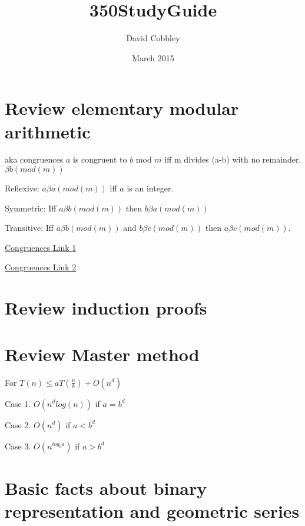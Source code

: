 \documentclass[10 pt]{article}
\title{350StudyGuide}
\author{David Cobbley }
\date{March 2015}
\begin{document}
\maketitle

\tableofcontents
\pagebreak
\section{Review elementary modular arithmetic}
aka congruences
$a$ is congruent to $b$ mod $m$ iff m divides (a-b) with no remainder. $\beta b(mod (m))$

Reflexive: $a \beta a(mod(m))$ iff $a$ is an integer.

Symmetric: Iff $a \beta b(mod(m))$ then $b \beta a(mod(m))$

Transitive: Iff $a \beta b(mod (m))$ and $ b \beta c(mod(m))$ then $a \beta c(mod(m))$.





\href{http://www.articlesforeducators.com/article.asp?aid=161#.VQTEfY7F_iU}{Congruences Link 1}

\href{http://mathworld.wolfram.com/Congruence.html}{Congruences Link 2}

\section{Review induction proofs}


\section{Review Master method}
For $T(n) \leq aT (\frac{n}{b}) + O(n^d)$

Case 1. $O(n^d log(n))$ if $a = b^d$

Case 2. $O(n^d)$ if $a < b^d$

Case 3. $O(n^{log_b a})$ if $a>b^d$ 


\section{Basic facts about binary representation and geometric series}
\end{document}
